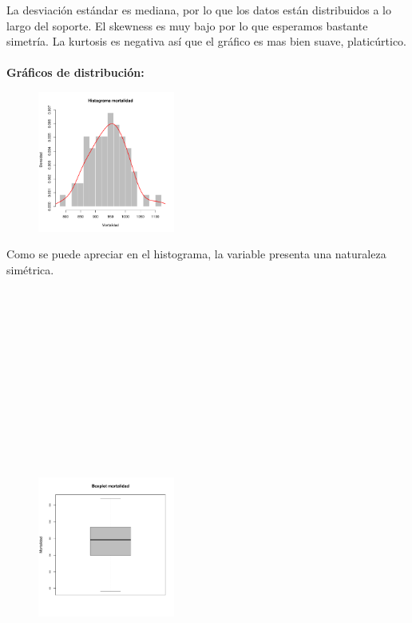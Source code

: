 \documentclass[11pt]{article}
\begin{document}
La desviación estándar es mediana, por lo que los datos están distribuidos a lo largo del soporte. El skewness es muy bajo por lo que esperamos bastante simetría. La kurtosis es negativa así que el gráfico es mas bien suave, platicúrtico.
\\
\\
\textbf{Gráficos de distribución:}
\\

\begin{figure}
    \centering
    \includegraphics[width = 0.4\textwidth]{histmo}
\end{figure}

Como se puede apreciar en el histograma, la variable presenta una naturaleza simétrica.
\\
\\
\\
\\
\\
\\
\\
\\
\\
\\
\\
\\
\\
\begin{figure}
    \centering
    \includegraphics[width = 0.4\textwidth]{boxmo}
\end{figure}
\end{document}
